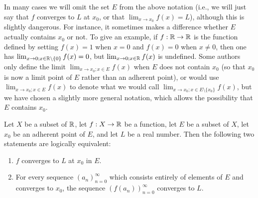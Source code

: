 \begin{rmk}\label{9.3.7}
  In many cases we will omit the set \(E\) from the above notation (i.e., we will just say that \(f\) converges to \(L\) at \(x_0\), or that \(\lim_{x \to x_0} f(x) = L\)), although this is slightly dangerous.
  For instance, it sometimes makes a difference whether \(E\) actually contains \(x_0\) or not.
  To give an example, if \(f : \mathbb{R} \to \mathbb{R}\) is the function defined by setting \(f(x) = 1\) when \(x = 0\) and \(f(x) = 0\) when \(x \neq 0\), then one has \(\lim_{x \to 0 ; x \in \mathbb{R} \setminus \{0\}} f(x) = 0\), but \(\lim_{x \to 0 ; x \in \mathbb{R}} f(x)\) is undefined.
  Some authors only define the limit \(\lim_{x \to x_0 ; x \in E} f(x)\) when \(E\) does not contain \(x_0\) (so that \(x_0\) is now a limit point of \(E\) rather than an adherent point), or would use \(\lim_{x \to x_0 ; x \in E} f(x)\) to denote what we would call \(\lim_{x \to x_0 ; x \in E \setminus \{x_0\}} f(x)\), but we have chosen a slightly more general notation, which allows the possibility that \(E\) contains \(x_0\).
\end{rmk}

\setcounter{thm}{8}
\begin{prop}\label{9.3.9}
  Let \(X\) be a subset of \(\mathbb{R}\), let \(f : X \to \mathbb{R}\) be a function, let \(E\) be a subset of \(X\), let \(x_0\) be an adherent point of \(E\), and let \(L\) be a real number.
  Then the following two statements are logically equivalent:
  \begin{enumerate}
    \item \(f\) converges to \(L\) at \(x_0\) in \(E\).
    \item For every sequence \((a_n)_{n = 0}^\infty\) which consists entirely of elements of \(E\) and converges to \(x_0\), the sequence \((f(a_n))_{n = 0}^\infty\) converges to \(L\).
  \end{enumerate}
\end{prop}

